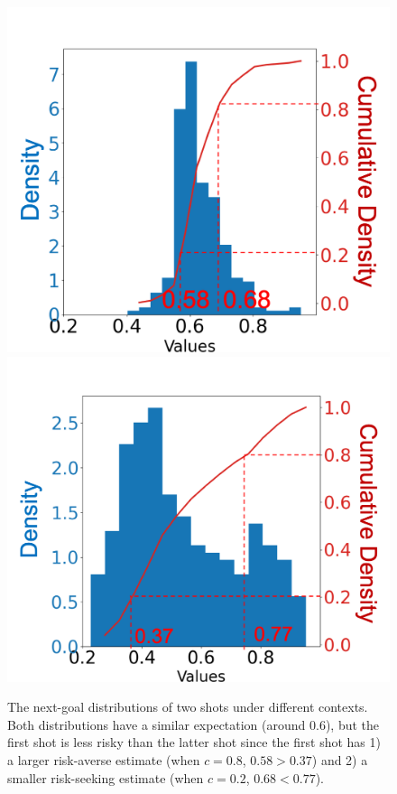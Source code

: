 \documentclass{article}
\begin{document}
\begin{figure}[htbp]
    \includegraphics[scale=0.15]{figures/density_idx_7_XCoord_85.69_YCoord_-21.88_marked.png}
    \includegraphics[scale=0.15]{figures/density_idx_21_XCoord_74.75_YCoord_-0.25_marked.png}
    \vspace{-0.1in}
    \caption{The next-goal distributions of two shots under different contexts. Both distributions have a similar expectation (around 0.6), but the first shot is less risky than the latter shot since the first shot has 1) a larger risk-averse estimate (when $c=0.8$, $0.58 > 0.37$) and 2) a smaller risk-seeking estimate (when $c=0.2$, $0.68 < 0.77$). }
    \label{fig:distribution-of-shot-returns}
    \vspace{-0.15in}
\end{figure}
\end{document}
